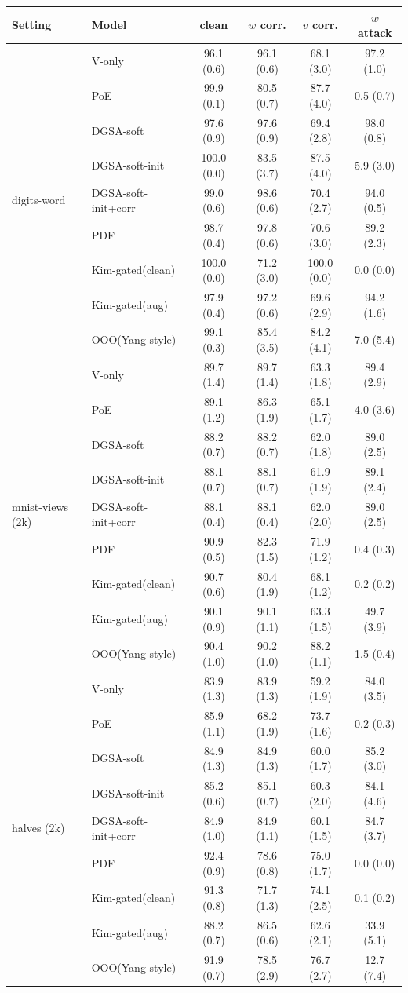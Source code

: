 \small
\begin{tabular}{llcccc}
\toprule
Setting & Model & clean & $w$ corr. & $v$ corr. & $w$ attack \\
\midrule
\multirow{9}{*}{digits-word} & V-only & 96.1 (0.6) & 96.1 (0.6) & 68.1 (3.0) & 97.2 (1.0) \\
 & PoE & 99.9 (0.1) & 80.5 (0.7) & 87.7 (4.0) & 0.5 (0.7) \\
 & DGSA-soft & 97.6 (0.9) & 97.6 (0.9) & 69.4 (2.8) & 98.0 (0.8) \\
 & DGSA-soft-init & 100.0 (0.0) & 83.5 (3.7) & 87.5 (4.0) & 5.9 (3.0) \\
 & DGSA-soft-init+corr & 99.0 (0.6) & 98.6 (0.6) & 70.4 (2.7) & 94.0 (0.5) \\
 & PDF & 98.7 (0.4) & 97.8 (0.6) & 70.6 (3.0) & 89.2 (2.3) \\
 & Kim-gated(clean) & 100.0 (0.0) & 71.2 (3.0) & 100.0 (0.0) & 0.0 (0.0) \\
 & Kim-gated(aug) & 97.9 (0.4) & 97.2 (0.6) & 69.6 (2.9) & 94.2 (1.6) \\
 & OOO(Yang-style) & 99.1 (0.3) & 85.4 (3.5) & 84.2 (4.1) & 7.0 (5.4) \\
\midrule
\multirow{9}{*}{mnist-views (2k)} & V-only & 89.7 (1.4) & 89.7 (1.4) & 63.3 (1.8) & 89.4 (2.9) \\
 & PoE & 89.1 (1.2) & 86.3 (1.9) & 65.1 (1.7) & 4.0 (3.6) \\
 & DGSA-soft & 88.2 (0.7) & 88.2 (0.7) & 62.0 (1.8) & 89.0 (2.5) \\
 & DGSA-soft-init & 88.1 (0.7) & 88.1 (0.7) & 61.9 (1.9) & 89.1 (2.4) \\
 & DGSA-soft-init+corr & 88.1 (0.4) & 88.1 (0.4) & 62.0 (2.0) & 89.0 (2.5) \\
 & PDF & 90.9 (0.5) & 82.3 (1.5) & 71.9 (1.2) & 0.4 (0.3) \\
 & Kim-gated(clean) & 90.7 (0.6) & 80.4 (1.9) & 68.1 (1.2) & 0.2 (0.2) \\
 & Kim-gated(aug) & 90.1 (0.9) & 90.1 (1.1) & 63.3 (1.5) & 49.7 (3.9) \\
 & OOO(Yang-style) & 90.4 (1.0) & 90.2 (1.0) & 88.2 (1.1) & 1.5 (0.4) \\
\midrule
\multirow{9}{*}{halves (2k)} & V-only & 83.9 (1.3) & 83.9 (1.3) & 59.2 (1.9) & 84.0 (3.5) \\
 & PoE & 85.9 (1.1) & 68.2 (1.9) & 73.7 (1.6) & 0.2 (0.3) \\
 & DGSA-soft & 84.9 (1.3) & 84.9 (1.3) & 60.0 (1.7) & 85.2 (3.0) \\
 & DGSA-soft-init & 85.2 (0.6) & 85.1 (0.7) & 60.3 (2.0) & 84.1 (4.6) \\
 & DGSA-soft-init+corr & 84.9 (1.0) & 84.9 (1.1) & 60.1 (1.5) & 84.7 (3.7) \\
 & PDF & 92.4 (0.9) & 78.6 (0.8) & 75.0 (1.7) & 0.0 (0.0) \\
 & Kim-gated(clean) & 91.3 (0.8) & 71.7 (1.3) & 74.1 (2.5) & 0.1 (0.2) \\
 & Kim-gated(aug) & 88.2 (0.7) & 86.5 (0.6) & 62.6 (2.1) & 33.9 (5.1) \\
 & OOO(Yang-style) & 91.9 (0.7) & 78.5 (2.9) & 76.7 (2.7) & 12.7 (7.4) \\
\bottomrule
\end{tabular}
